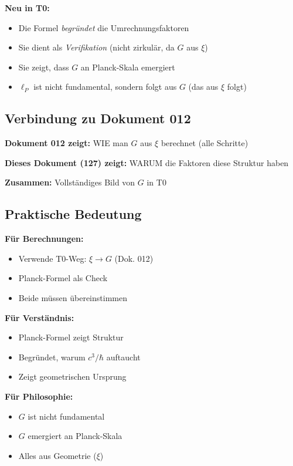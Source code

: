 	\textbf{Neu in T0:}
	\begin{itemize}
		\item Die Formel \textit{begründet} die Umrechnungsfaktoren
		\item Sie dient als \textit{Verifikation} (nicht zirkulär, da $G$ aus $\xi$)
		\item Sie zeigt, dass $G$ an Planck-Skala emergiert
		\item $\ell_P$ ist nicht fundamental, sondern folgt aus $G$ (das aus $\xi$ folgt)
	\end{itemize}
	
	\subsection{Verbindung zu Dokument 012}
	
	\textbf{Dokument 012 zeigt:} WIE man $G$ aus $\xi$ berechnet (alle Schritte)
	
	\textbf{Dieses Dokument (127) zeigt:} WARUM die Faktoren diese Struktur haben
	
	\textbf{Zusammen:} Vollständiges Bild von $G$ in T0
	
	\subsection{Praktische Bedeutung}
	
	\textbf{Für Berechnungen:}
	\begin{itemize}
		\item Verwende T0-Weg: $\xi \to G$ (Dok. 012)
		\item Planck-Formel als Check
		\item Beide müssen übereinstimmen
	\end{itemize}
	
	\textbf{Für Verständnis:}
	\begin{itemize}
		\item Planck-Formel zeigt Struktur
		\item Begründet, warum $c^3/\hbar$ auftaucht
		\item Zeigt geometrischen Ursprung
	\end{itemize}
	
	\textbf{Für Philosophie:}
	\begin{itemize}
		\item $G$ ist nicht fundamental
		\item $G$ emergiert an Planck-Skala
		\item Alles aus Geometrie ($\xi$)
	\end{itemize}
	